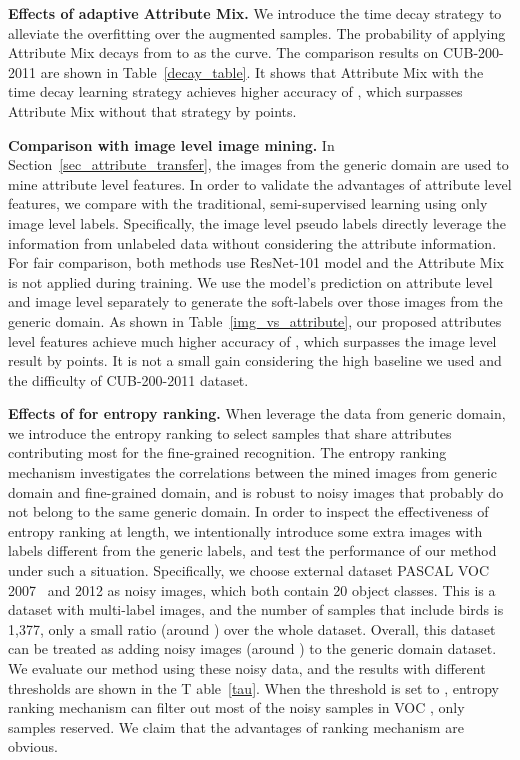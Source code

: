 \documentclass[runningheads]{llncs}
\begin{document}
\textbf{Effects of adaptive Attribute Mix.}
We introduce the time decay strategy to alleviate the overfitting over the augmented samples. The probability of applying Attribute Mix decays from  to  as the  curve. The comparison results on CUB-200-2011 are shown in Table~\ref{decay_table}. It shows that Attribute Mix with the time decay learning strategy achieves higher accuracy of , which surpasses Attribute Mix without that strategy by  points. 


\textbf{Comparison with image level image mining.}
In Section~\ref{sec_attribute_transfer}, the images from the generic domain are used to mine attribute level features. In order to validate the advantages of attribute level features, we compare with the traditional, semi-supervised learning using only image level labels. Specifically, the image level pseudo labels directly leverage the information from unlabeled data  without considering the attribute information. For fair comparison, both methods use ResNet-101 model and the Attribute Mix is not applied during training. We use the model's prediction on attribute level and image level separately to generate the soft-labels over those images from the generic domain. As shown in Table~\ref{img_vs_attribute}, our proposed attributes level features achieve much higher accuracy of , which surpasses the image level result  by  points. It is not a small gain considering the high baseline we used and the difficulty of CUB-200-2011 dataset.








\textbf{Effects of  for entropy ranking.}
When leverage the data from generic domain, we introduce the entropy ranking to select samples that share attributes contributing most for the fine-grained recognition.
The entropy ranking mechanism investigates the correlations between the mined images from generic domain and fine-grained domain, and is robust to noisy images that probably do not belong to the same generic domain. In order to inspect the effectiveness of entropy ranking at length, we intentionally introduce some extra images with labels different from the generic labels, and test the performance of our method under such a situation.
Specifically, we choose external dataset PASCAL VOC 2007~\cite{everingham2007pascal} and 2012 \cite{pascal-voc-2012} as noisy images, which both contain 20 object classes. This is a dataset with multi-label images, and the number of samples that include birds is 1,377, only a small ratio (around ) over the whole dataset. Overall, this dataset can be treated as adding noisy images (around ) to the generic domain dataset. We evaluate our method using these noisy data, and the results with different thresholds  are shown in the T
able~\ref{tau}. When the threshold  is set to , entropy ranking mechanism can filter out most of the noisy samples in VOC , only  samples reserved.  We claim that the advantages of ranking mechanism are obvious.
\end{document}
